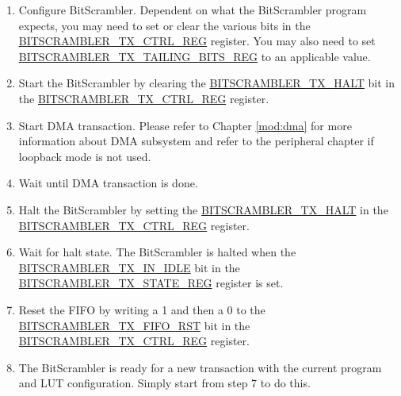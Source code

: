 \documentclass[main\_\_EN.tex]{subfiles}
\begin{document}
\begin{enumerate}
\begin{enumerate}
        \item Write the address to the \hyperref[regdesc:BITSCRAMBLERTXLUTCFG0REG]{BITSCRAMBLER\_TX\_LUT\_CFG0\_REG}
        \item Write the data word or the byte itself to \hyperref[regdesc:BITSCRAMBLERTXLUTCFG1REG]{BITSCRAMBLER\_TX\_LUT\_CFG1\_REG}
    \end{enumerate}
        Note that it is acceptable to change the LUT width after writing the data and before starting the BitScrambler.
    \item Configure BitScrambler. Dependent on what the BitScrambler program expects, you may need to set or clear the various bits in the \hyperref[regdesc:BITSCRAMBLERTXCTRLREG]{BITSCRAMBLER\_TX\_CTRL\_REG} register. You may also need to set \hyperref[regdesc:BITSCRAMBLERTXTAILINGBITSREG]{BITSCRAMBLER\_TX\_TAILING\_BITS\_REG} to an applicable value.
    \item Start the BitScrambler by clearing the \hyperref[fielddesc:BITSCRAMBLERTXHALT]{BITSCRAMBLER\_TX\_HALT} bit in the \hyperref[regdesc:BITSCRAMBLERTXCTRLREG]{BITSCRAMBLER\_TX\_CTRL\_REG} register.
    \item Start DMA transaction. Please refer to Chapter \ref{mod:dma} \textit{} for more information about DMA subsystem and refer to the peripheral chapter if loopback mode is not used.
    \item Wait until DMA transaction is done.
    \item Halt the BitScrambler by setting the \hyperref[fielddesc:BITSCRAMBLERTXHALT]{BITSCRAMBLER\_TX\_HALT} in the \hyperref[regdesc:BITSCRAMBLERTXCTRLREG]{BITSCRAMBLER\_TX\_CTRL\_REG} register.
    \item Wait for halt state. The BitScrambler is halted when the \hyperref[fielddesc:BITSCRAMBLERTXINIDLE]{BITSCRAMBLER\_TX\_IN\_IDLE} bit in the \hyperref[regdesc:BITSCRAMBLERTXSTATEREG]{BITSCRAMBLER\_TX\_STATE\_REG} register is set.
    \item Reset the FIFO by writing a 1 and then a 0 to the \hyperref[fielddesc:BITSCRAMBLERTXFIFORST]{BITSCRAMBLER\_TX\_FIFO\_RST} bit in the \hyperref[regdesc:BITSCRAMBLERTXCTRLREG]{BITSCRAMBLER\_TX\_CTRL\_REG} register.
    \item The BitScrambler is ready for a new transaction with the current program and LUT configuration. Simply start from step 7 to do this.
\end{enumerate}



\end{document}
